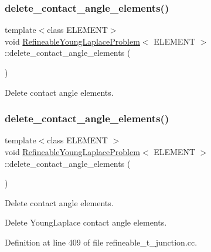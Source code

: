 \subsubsection{\texorpdfstring{delete\+\_\+contact\+\_\+angle\+\_\+elements()}{delete\_contact\_angle\_elements()}\hspace{0.1cm}{\footnotesize\ttfamily [1/2]}}
{\footnotesize\ttfamily template$<$class E\+L\+E\+M\+E\+NT$>$ \\
void \hyperlink{classRefineableYoungLaplaceProblem}{Refineable\+Young\+Laplace\+Problem}$<$ E\+L\+E\+M\+E\+NT $>$\+::delete\+\_\+contact\+\_\+angle\+\_\+elements (\begin{DoxyParamCaption}{ }\end{DoxyParamCaption})\hspace{0.3cm}{\ttfamily [private]}}



Delete contact angle elements. 

\mbox{\label{classRefineableYoungLaplaceProblem_aaa270ba8da395897a5a99d052f076e0c}} 
\subsubsection{\texorpdfstring{delete\+\_\+contact\+\_\+angle\+\_\+elements()}{delete\_contact\_angle\_elements()}\hspace{0.1cm}{\footnotesize\ttfamily [2/2]}}
{\footnotesize\ttfamily template$<$class E\+L\+E\+M\+E\+NT $>$ \\
void \hyperlink{classRefineableYoungLaplaceProblem}{Refineable\+Young\+Laplace\+Problem}$<$ E\+L\+E\+M\+E\+NT $>$\+::delete\+\_\+contact\+\_\+angle\+\_\+elements (\begin{DoxyParamCaption}{ }\end{DoxyParamCaption})\hspace{0.3cm}{\ttfamily [private]}}



Delete contact angle elements. 

Delete Young\+Laplace contact angle elements. 

Definition at line 409 of file refineable\+\_\+t\+\_\+junction.\+cc.

